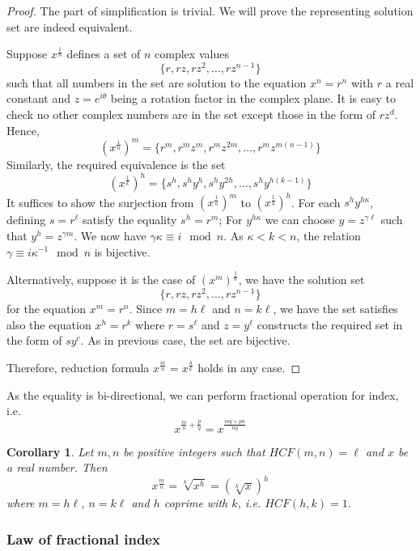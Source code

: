 \documentclass[12pt]{article}
\newtheorem*{corollary}{Corollary}
\begin{document}
    \begin{proof}
        The part of simplification is trivial. We will prove the representing solution set are indeed equivalent.

        Suppose $x^{\frac{1}{n}}$ defines a set of $n$ complex values $$\{r,rz,rz^2,\dots,rz^{n-1}\}$$ such that all numbers in the set are solution to the equation $x^n=r^n$ with $r$ a real constant and $z=e^{i\theta}$ being a rotation factor in the complex plane. It is easy to check no other complex numbers are in the set except those in the form of $rz^d$. Hence, $$(x^{\frac{1}{n}})^m=\{r^m, r^m z^m, r^m z^{2m}, \dots, r^m z^{m(n-1)}\}$$
        Similarly, the required equivalence is the set $$(x^{\frac{1}{k}})^h=\{s^h, s^h y^h, s^h y^{2h}, \dots, s^h y^{h(k-1)}\}$$
        It suffices to show the surjection from $(x^{\frac{1}{n}})^m$ to $(x^{\frac{1}{k}})^h$. For each $s^h y^{h\kappa}$, defining $s=r^\ell$ satisfy the equality $s^h=r^m$; For $y^{h\kappa}$ we can choose $y=z^{\gamma\ell}$ such that $y^h=z^{\gamma m}$. We now have $\gamma\kappa \equiv i \mod n$. As $\kappa < k < n$, the relation $\gamma \equiv i \kappa^{-1} \mod n$ is bijective.

        Alternatively, suppose it is the case of $(x^m)^{\frac{1}{n}}$, we have the solution set $$\{r, rz, rz^2, \dots, rz^{n-1}\}$$ for the equation $x^m=r^n$. Since $m=h\ell$ and $n=k\ell$, we have the set satisfies also the equation $x^h=r^k$ where $r=s^\ell$ and $z=y^\ell$ constructs the required set in the form of $sy^c$. As in previous case, the set are bijective.
        
        Therefore, reduction formula $x^{\frac{m}{n}}=x^{\frac{h}{k}}$ holds in any case.
    \end{proof}

    As the equality is bi-directional, we can perform fractional operation for index, i.e. $$x^{\frac{m}{n}+\frac{p}{q}}=x^{\frac{mq+pn}{nq}}$$

    \begin{corollary}
        Let $m,n$ be positive integers such that $HCF(m,n)=\ell$ and $x$ be a real number.  Then $$x^{\frac{m}{n}}=\sqrt[k]{x^h}=(\sqrt[k]{x})^h$$ where $m=h\ell$, $n=k\ell$ and $h$ coprime with $k$, i.e. $HCF(h,k)=1$.
    \end{corollary}

    \subsubsection*{Law of fractional index}
\end{document}
